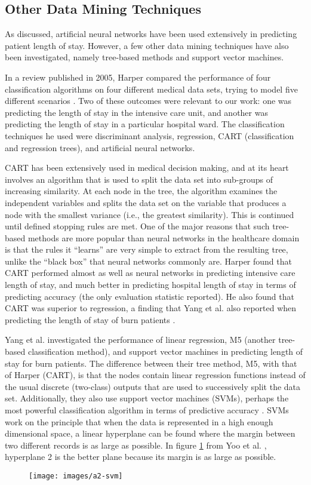\subsection{Other Data Mining Techniques}
As discussed, artificial neural networks have been used extensively in
predicting patient length of stay. However, a few other data mining techniques
have also been investigated, namely tree-based methods and support vector
machines.

In a review published in 2005, Harper compared the performance of four
classification algorithms on four different medical data sets, trying to
model five different scenarios \citep{Harper2005}. Two of these outcomes were
relevant to our work: one was predicting the length of stay in the intensive
care unit, and another was predicting the length of stay in a particular
hospital ward. The classification techniques he used were discriminant
analysis, regression, CART (classification and regression trees),
and artificial neural networks.

CART has been extensively used in medical decision making, and at its heart
involves an algorithm that is used to split the data set into sub-groups of
increasing similarity. At each node in the tree, the algorithm examines the
independent variables and splits the data set on the variable that produces
a node with the smallest variance (i.e., the greatest similarity). This is
continued until defined stopping rules are met. One of the major reasons that
such tree-based methods are more popular than neural networks in the
healthcare domain is that the rules it ``learns'' are very simple to extract
from the resulting tree, unlike the ``black box'' that neural networks commonly
are. Harper found that CART performed almost as well as neural networks in
predicting intensive care length of stay, and much better in predicting
hospital length of stay in terms of predicting accuracy (the only evaluation
statistic reported). He also found that CART was superior to regression, a
finding that Yang et al. also reported when predicting the length of stay of
burn patients \citep{Yang2010}.

Yang et al. investigated the performance of linear regression, M5 (another
tree-based classification method), and support vector machines in predicting
length of stay for burn patients. The difference between their tree method,
M5, with that of Harper (CART), is that the nodes contain linear regression
functions instead of the usual discrete (two-class) outputs that are used to
successively split the data set. Additionally, they also use support vector
machines (SVMs), perhaps the most powerful classification algorithm in terms of
predictive accuracy \citep{Bellazzi2008}. SVMs work on the principle that when
the data is represented in a high enough dimensional space, a linear hyperplane
can be found where the margin between two different records is as large as
possible. In figure \ref{svm} from Yoo et al. \citep{Yoo2012}, hyperplane 2
is the better plane because its margin is as large as possible. 
\begin{figure}[h]
\label{svm}
\caption{}
\centering
\texttt{[image: images/a2-svm]}
\end{figure}

